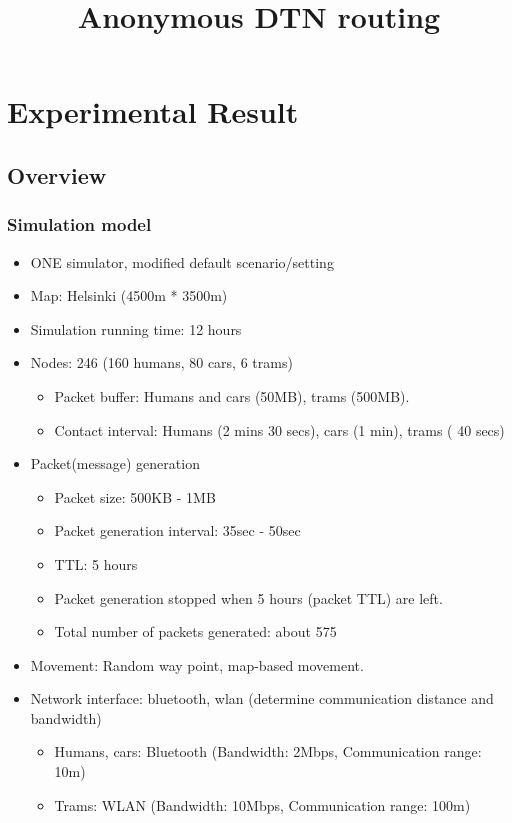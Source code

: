 \documentclass[11pt]{article}
\begin{document}
\title{Anonymous DTN routing}
\maketitle

\section{Experimental Result}
\subsection{Overview}

\subsubsection{Simulation model}
\begin{itemize}
 \item ONE simulator, modified default scenario/setting

 \item Map: Helsinki (4500m * 3500m)

 \item Simulation running time: 12 hours

 \item Nodes: 246 (160 humans, 80 cars, 6 trams)
  \begin{itemize}
   \item Packet buffer: Humans and cars (50MB), trams (500MB).
   \item Contact interval: Humans (2 mins 30 secs), cars (1 min), trams ( 40 secs)
  \end{itemize}

 \item Packet(message) generation
  \begin{itemize}
   \item Packet size: 500KB - 1MB
   \item Packet generation interval: 35sec - 50sec
   \item TTL: 5 hours
   \item Packet generation stopped when 5 hours (packet TTL) are left.   
   \item Total number of packets generated: about 575
  \end{itemize}

 \item Movement: Random way point, map-based movement.

 \item Network interface: bluetooth, wlan (determine communication distance and bandwidth)
  \begin{itemize}
   \item Humans, cars: Bluetooth (Bandwidth: 2Mbps, Communication range: 10m)
   \item Trams: WLAN (Bandwidth: 10Mbps, Communication range: 100m)
  \end{itemize}

\end{itemize}
\end{document}
